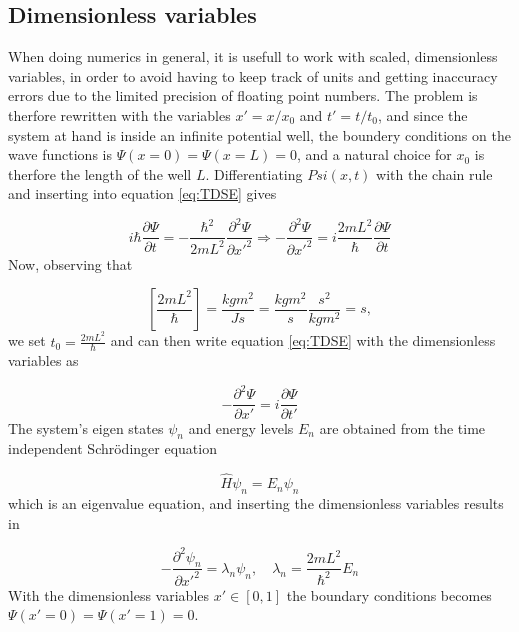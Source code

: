 \documentclass{article}
\begin{document}
\subsection{Dimensionless variables}
When doing numerics in general, it is usefull to work with scaled, dimensionless variables, in order to avoid having to keep track of units and getting inaccuracy errors due to the limited precision of floating point numbers. The problem is therfore rewritten with the variables $x' = x/x_0$ and $t' = t/t_0$, and since the system at hand is inside an infinite potential well, the boundery conditions on the wave functions is $\Psi(x=0) = \Psi(x=L) = 0$, and a natural choice for $x_0$ is therfore the length of the well $L$. Differentiating $Psi(x, t)$ with the chain rule and inserting into equation \ref{eq:TDSE} gives

\begin{equation}
    i\hbar \frac{\partial \Psi}{\partial t} = -\frac{\hbar^2}{2mL^2}\frac{\partial^2 \Psi}{\partial x'^2}\Rightarrow - \frac{\partial ^2 \Psi}{\partial x'^2} = i \frac{2mL^2}{\hbar}\frac{\partial \Psi}{\partial t}
\end{equation}
Now, observing that

\begin{equation}
    \left[\frac{2mL^2}{\hbar} \right] = \frac{kgm^2}{Js} = \frac{kgm^2}{s}\frac{s^2}{kgm^2}=s,
\end{equation}
we set $t_0 = \frac{2mL^2}{\hbar}$ and can then write equation \ref{eq:TDSE} with the dimensionless variables as

\begin{equation}
    -\frac{\partial^2\Psi}{\partial x'} = i\frac{\partial\Psi}{\partial t'}
\end{equation}
The system's eigen states $\psi_n$ and energy levels $E_n$ are obtained from the time independent Schrödinger equation

\begin{equation}
    \hat{H}\psi_n = E_n \psi_n
\end{equation}
which is an eigenvalue equation, and inserting the dimensionless variables results in

\begin{equation}
    -\frac{\partial ^2\psi_n}{\partial x'^2} = \lambda_n \psi_n, \quad \lambda_n = 
    \frac{2mL^2}{\hbar^2}E_n
    \label{eq:TISE-dimless}
\end{equation}
With the dimensionless variables $x' \in [0, 1]$ the boundary conditions becomes $\Psi(x'=0) = \Psi(x'=1) = 0$.
\end{document}
